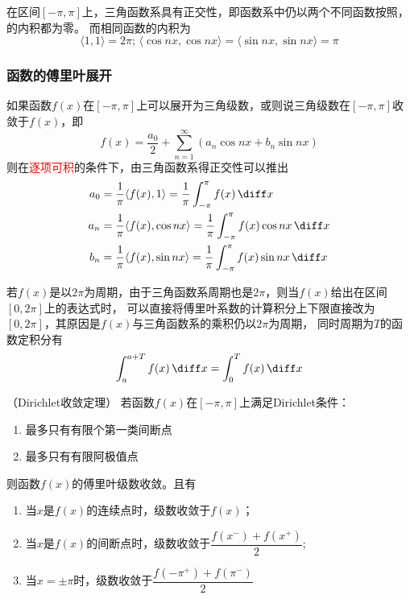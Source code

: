 在区间$[-\pi,\pi]$上，三角函数系具有正交性，即函数系中仍以两个不同函数按照，的内积都为零。
而相同函数的内积为
\[
    \langle 1,1 \rangle = 2\pi;\,
    \langle \cos nx, \cos nx \rangle
    =
    \langle \sin nx, \sin nx\rangle
    =
    \pi
\]

\subsubsection{函数的傅里叶展开}
如果函数$f(x)$在$[-\pi,\pi]$上可以展开为三角级数，或则说三角级数在$[-\pi,\pi]$收敛于$f(x)$，即
\begin{equation}
    f(x) = \frac{a_0}{2} + \sum_{n=1}^\infty (a_n\cos nx + b_n \sin nx)
\end{equation}
则在\textcolor{red}{逐项可积}的条件下，由三角函数系得正交性可以推出
\begin{align}
    a_0 & = \frac{1}{\pi}\langle f(x),1 \rangle        = \frac{1}{\pi}\int_{-\pi}^{\pi} f(x)\,\diff x        \\
    a_n & = \frac{1}{\pi}\langle f(x),\cos nx \rangle  = \frac{1}{\pi}\int_{-\pi}^{\pi} f(x)\cos nx\,\diff x \\
    b_n & = \frac{1}{\pi}\langle f(x),\sin nx \rangle  = \frac{1}{\pi}\int_{-\pi}^{\pi} f(x)\sin nx\,\diff x
\end{align}

若$f(x)$是以$2\pi$为周期，由于三角函数系周期也是$2\pi$，则当$f(x)$给出在区间$[0,2\pi]$上的表达式时，
可以直接将傅里叶系数的计算积分上下限直接改为$[0,2\pi]$，其原因是$f(x)$与三角函数系的乘积仍以$2\pi$为周期，
同时周期为$T$的函数定积分有
\[ \int_a^{a+T} f(x)\,\diff x = \int_0^T f(x)\,\diff x \]

\begin{theorem}
    （Dirichlet收敛定理）
    \label{th:Dirichlet收敛定理}
    若函数$f(x)$在$[-\pi,\pi]$上满足Dirichlet条件：
    \begin{enumerate}[(1)]
        \item 最多只有有限个第一类间断点
        \item 最多只有有限阿极值点
    \end{enumerate}
    则函数$f(x)$的傅里叶级数收敛。且有
    \begin{enumerate}[(1)]
        \item 当$x$是$f(x)$的连续点时，级数收敛于$f(x)$；
        \item 当$x$是$f(x)$的间断点时，级数收敛于$\dfrac{f(x^-)+f(x^+)}{2}$;
        \item 当$x=\pm\pi$时，级数收敛于$\dfrac{f(-\pi^+)+f(\pi^-)}{2}$
    \end{enumerate}
\end{theorem}


